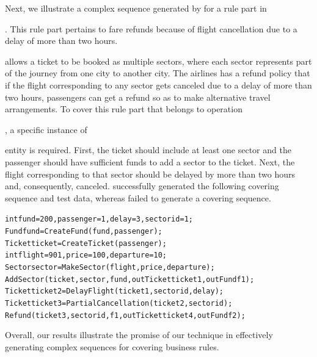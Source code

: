 
Next, we illustrate a complex sequence generated by \tool{} for a rule part in
\subject{Cebu-pacific}. This rule part pertains to fare refunds because of
flight cancellation due to a delay of more than two
hours. \subject{Cebu-pacific} allows a ticket to be booked as multiple sectors,
where each sector represents part of the journey from one city to another
city. The airlines has a refund policy that if the flight corresponding to any
sector gets canceled due to a delay of more than two hours, passengers can get a
refund so as to make alternative travel arrangements. To cover this rule part
that belongs to operation \subject{Refund}, a specific instance of
\subject{Ticket} entity is required. First, the ticket should include at least
one sector and the passenger should have sufficient funds to add a sector to the
ticket. Next, the flight corresponding to that sector should be delayed by more
than two hours and, consequently, canceled. \tool{} successfully generated the
following covering sequence and test data, whereas \exhaust{} failed to generate
a covering sequence.

{\scriptsize
\begin{alltt}
 int fund = 200, passenger = 1, delay = 3, sectorid = 1;
 Fund fund = CreateFund(fund, passenger);
 Ticket ticket = CreateTicket(passenger);
 int flight = 901, price = 100, departure = 10; 
 Sector sector = MakeSector(flight, price, departure);
 AddSector(ticket, sector, fund, out Ticket ticket1, out Fund f1); 
 Ticket ticket2 = DelayFlight(ticket1, sectorid, delay);
 Ticket ticket3 = PartialCancellation(ticket2, sectorid);
 Refund(ticket3, sectorid, f1, out Ticket ticket4, out Fund f2);
\end{alltt}
}

Overall, our results illustrate the promise of our technique in effectively
generating complex sequences for covering business rules.


